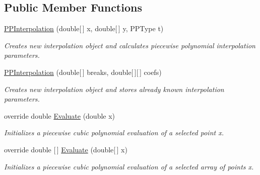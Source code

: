 \subsection*{Public Member Functions}
\begin{DoxyCompactItemize}
\item 
\mbox{\hyperlink{class_isotope_fit_1_1_p_p_interpolation_afaeb635a338f06714d3b12e3865ac4f2}{P\+P\+Interpolation}} (double\mbox{[}$\,$\mbox{]} x, double\mbox{[}$\,$\mbox{]} y, P\+P\+Type t)
\begin{DoxyCompactList}\small\item\em Creates new interpolation object and calculates piecewise polynomial interpolation parameters. \end{DoxyCompactList}\item 
\mbox{\hyperlink{class_isotope_fit_1_1_p_p_interpolation_a22298333495a707643412a540e461188}{P\+P\+Interpolation}} (double\mbox{[}$\,$\mbox{]} breaks, double\mbox{[}$\,$\mbox{]}\mbox{[}$\,$\mbox{]} coefs)
\begin{DoxyCompactList}\small\item\em Creates new interpolation object and stores already known interpolation parameters. \end{DoxyCompactList}\item 
override double \mbox{\hyperlink{class_isotope_fit_1_1_p_p_interpolation_a1849081f6f187cb948c7f8f7dba866af}{Evaluate}} (double x)
\begin{DoxyCompactList}\small\item\em Initializes a piecewise cubic polynomial evaluation of a selected point x. \end{DoxyCompactList}\item 
override double \mbox{[}$\,$\mbox{]} \mbox{\hyperlink{class_isotope_fit_1_1_p_p_interpolation_a5a4a1dbfcaa78e520dfc965e64ed227c}{Evaluate}} (double\mbox{[}$\,$\mbox{]} x)
\begin{DoxyCompactList}\small\item\em Initializes a piecewise cubic polynomial evaluation of a selected array of points x. \end{DoxyCompactList}\end{DoxyCompactItemize}
